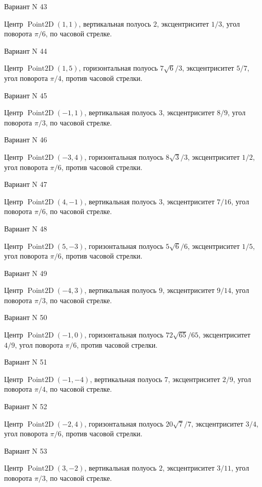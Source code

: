 \documentclass[11pt]{report}
\begin{document}
Вариант N 43

Центр $\operatorname{Point2D}\left(1, 1\right)$, вертикальная полуось $2$, эксцентриситет $1 / 3$, угол поворота $\pi / 6$, по часовой стрелке.

Вариант N 44

Центр $\operatorname{Point2D}\left(1, 5\right)$, горизонтальная полуось $7 \sqrt{6} / 3$, эксцентриситет $5 / 7$, угол поворота $\pi / 4$, против часовой стрелки.

Вариант N 45

Центр $\operatorname{Point2D}\left(-1, 1\right)$, вертикальная полуось $3$, эксцентриситет $8 / 9$, угол поворота $\pi / 3$, по часовой стрелке.

Вариант N 46

Центр $\operatorname{Point2D}\left(-3, 4\right)$, горизонтальная полуось $8 \sqrt{3} / 3$, эксцентриситет $1 / 2$, угол поворота $\pi / 6$, против часовой стрелки.

Вариант N 47

Центр $\operatorname{Point2D}\left(4, -1\right)$, вертикальная полуось $3$, эксцентриситет $7 / 16$, угол поворота $\pi / 6$, по часовой стрелке.

Вариант N 48

Центр $\operatorname{Point2D}\left(5, -3\right)$, горизонтальная полуось $5 \sqrt{6} / 6$, эксцентриситет $1 / 5$, угол поворота $\pi / 6$, против часовой стрелки.

Вариант N 49

Центр $\operatorname{Point2D}\left(-4, 3\right)$, вертикальная полуось $9$, эксцентриситет $9 / 14$, угол поворота $\pi / 3$, по часовой стрелке.

Вариант N 50

Центр $\operatorname{Point2D}\left(-1, 0\right)$, горизонтальная полуось $72 \sqrt{65} / 65$, эксцентриситет $4 / 9$, угол поворота $\pi / 6$, против часовой стрелки.

Вариант N 51

Центр $\operatorname{Point2D}\left(-1, -4\right)$, вертикальная полуось $7$, эксцентриситет $2 / 9$, угол поворота $\pi / 4$, по часовой стрелке.

Вариант N 52

Центр $\operatorname{Point2D}\left(-2, 4\right)$, горизонтальная полуось $20 \sqrt{7} / 7$, эксцентриситет $3 / 4$, угол поворота $\pi / 6$, против часовой стрелки.

Вариант N 53

Центр $\operatorname{Point2D}\left(3, -2\right)$, вертикальная полуось $2$, эксцентриситет $3 / 11$, угол поворота $\pi / 3$, по часовой стрелке.
\end{document}
